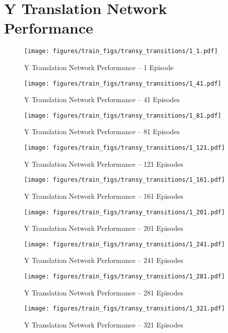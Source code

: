 \chapter{Y Translation Network Performance}
\label{appendix:y_perf}
\begin{figure}[H]
	\centering
	\texttt{[image: figures/train\_figs/transy\_transitions/1\_1.pdf]}
	\caption{Y Translation Network Performance -- 1 Episode}
\end{figure}
\begin{figure}[H]
	\centering
	\texttt{[image: figures/train\_figs/transy\_transitions/1\_41.pdf]}
	\caption{Y Translation Network Performance -- 41 Episodes}
\end{figure}
\begin{figure}[H]
	\centering
	\texttt{[image: figures/train\_figs/transy\_transitions/1\_81.pdf]}
	\caption{Y Translation Network Performance -- 81 Episodes}
\end{figure}
\begin{figure}[H]
	\centering
	\texttt{[image: figures/train\_figs/transy\_transitions/1\_121.pdf]}
	\caption{Y Translation Network Performance -- 121 Episodes}
\end{figure}
\begin{figure}[H]
	\centering
	\texttt{[image: figures/train\_figs/transy\_transitions/1\_161.pdf]}
	\caption{Y Translation Network Performance -- 161 Episodes}
\end{figure}
\begin{figure}[H]
	\centering
	\texttt{[image: figures/train\_figs/transy\_transitions/1\_201.pdf]}
	\caption{Y Translation Network Performance -- 201 Episodes}
\end{figure}
\begin{figure}[H]
	\centering
	\texttt{[image: figures/train\_figs/transy\_transitions/1\_241.pdf]}
	\caption{Y Translation Network Performance -- 241 Episodes}
\end{figure}
\begin{figure}[H]
	\centering
	\texttt{[image: figures/train\_figs/transy\_transitions/1\_281.pdf]}
	\caption{Y Translation Network Performance -- 281 Episodes}
\end{figure}
\begin{figure}[H]
	\centering
	\texttt{[image: figures/train\_figs/transy\_transitions/1\_321.pdf]}
	\caption{Y Translation Network Performance -- 321 Episodes}
\end{figure}
